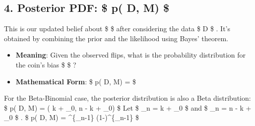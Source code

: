 \documentclass[11pt]{article}
\providecommand{\tightlist}{%
      \setlength{\itemsep}{0pt}\setlength{\parskip}{0pt}}
\begin{document}
    \subsection{\texorpdfstring{4. Posterior PDF: \$ p(\theta \textbar{} D,
M)
\$}{4. Posterior PDF: \$ p(\textbar{} D, M) \$}}\label{posterior-pdf-p-d-m}

This is our updated belief about \$ \theta \$ after considering the data
\$ D \$ . It's obtained by combining the prior and the likelihood using
Bayes' theorem.

\begin{itemize}
\tightlist
\item
  \textbf{Meaning}: Given the observed flips, what is the probability
  distribution for the coin's bias \$ \theta \$ ?
\item
  \textbf{Mathematical Form}: \$ p(\theta \textbar{} D, M) =
   \$
\end{itemize}

For the Beta-Binomial case, the posterior distribution is also a Beta
distribution: \$ p(\theta \textbar{} D, M) =
(\theta \textbar{} k + \alpha\_0, n - k + \beta\_0) \$ Let \$
\alpha\_n = k + \alpha\_0 \$ and \$ \beta\_n = n - k + \beta\_0 \$ . \$
p(\theta \textbar{} D, M) =
\theta\^{}\{\alpha\_n-1\} (1-\theta)\^{}\{\beta\_n-1\} \$
\end{document}
